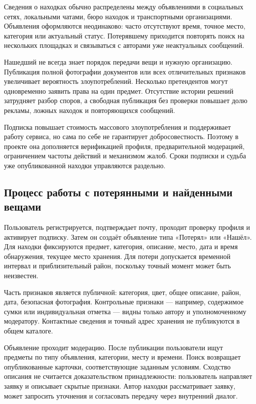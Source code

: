 Сведения о находках обычно распределены между объявлениями в социальных сетях, локальными чатами, бюро находок и транспортными организациями. Объявления оформляются неодинаково: часто отсутствуют время, точное место, категория или актуальный статус. Потерявшему приходится повторять поиск на нескольких площадках и связываться с авторами уже неактуальных сообщений.

Нашедший не всегда знает порядок передачи вещи и нужную организацию. Публикация полной фотографии документов или всех отличительных признаков увеличивает вероятность злоупотреблений. Несколько претендентов могут одновременно заявить права на один предмет. Отсутствие истории решений затрудняет разбор споров, а свободная публикация без проверки повышает долю рекламы, ложных находок и повторяющихся сообщений.

Подписка повышает стоимость массового злоупотребления и поддерживает работу сервиса, но сама по себе не гарантирует добросовестность. Поэтому в проекте она дополняется верификацией профиля, предварительной модерацией, ограничением частоты действий и механизмом жалоб. Сроки подписки и судьба уже опубликованной находки управляются раздельно.

\FloatBarrier
{}
\subsection{Процесс работы с потерянными и найденными вещами}

Пользователь регистрируется, подтверждает почту, проходит проверку профиля и активирует подписку. Затем он создаёт объявление типа «Потерял» или «Нашёл». Для находки фиксируются предмет, категория, описание, место, дата и время обнаружения, текущее место хранения. Для потери допускается временной интервал и приблизительный район, поскольку точный момент может быть неизвестен.

Часть признаков является публичной: категория, цвет, общее описание, район, дата, безопасная фотография. Контрольные признаки — например, содержимое сумки или индивидуальная отметка — видны только автору и уполномоченному модератору. Контактные сведения и точный адрес хранения не публикуются в общем каталоге.

Объявление проходит модерацию. После публикации пользователи ищут предметы по типу объявления, категории, месту и времени. Поиск возвращает опубликованные карточки, соответствующие заданным условиям. Сходство описания не считается доказательством принадлежности: пользователь направляет заявку и описывает скрытые признаки. Автор находки рассматривает заявку, может запросить уточнения и согласовать передачу через внутренний диалог.

